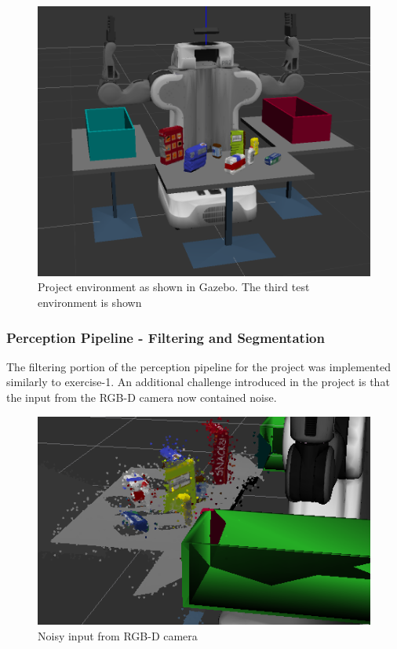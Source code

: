\documentclass{article}
\begin{document}
\begin{figure}[H]
    \includegraphics[width=\linewidth]{pr2.png}
    \caption{Project environment as shown in Gazebo. The third test environment is shown}
    \label{fig:pr2}
\end{figure}

\subsubsection{Perception Pipeline - Filtering and Segmentation}
The filtering portion of the perception pipeline for the project was implemented similarly to exercise-1. An additional challenge introduced in the project is that the input from the RGB-D camera now contained noise.

\begin{figure}[H]
    \includegraphics[width=\linewidth]{pr2noise.png}
    \caption{Noisy input from RGB-D camera}
    \label{fig:noise}
\end{figure}
\end{document}
